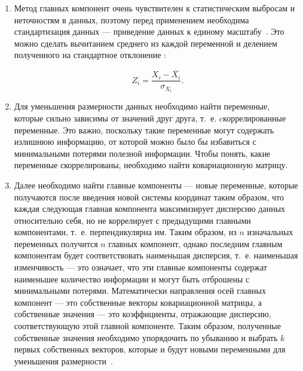 \begin{enumerate}[label=\arabic*.]
	\item Метод главных компонент очень чувствителен к статистическим выбросам и неточностям в данных, поэтому перед применением необходима стандартизация данных --- приведение данных к единому масштабу~\cite{polyak}. Это можно сделать вычитанием среднего из каждой переменной и делением полученного на стандартное отклонение \cite{zakaria}:
	
	\begin{equation}\label{eq:normalization_Z1}
		Z_i = \frac{{X_i - \bar{X_i}}}{{\sigma_{X_i}}}.
	\end{equation}
	\item Для уменьшения размерности данных необходимо найти переменные, которые сильно зависимы от значений друг друга, т.~е. cкоррелированные переменные. Это важно, поскольку такие переменные могут содержать излишнюю информацию, от которой можно было бы избавиться с минимальными потерями полезной информации. Чтобы понять, какие переменные скоррелированы, необходимо найти ковариационную матрицу.
	\item Далее необходимо найти главные компоненты --- новые переменные, которые получаются после введения новой системы координат таким образом, что каждая следующая главная компонента максимизирует дисперсию данных относительно себя, но не коррелирует с предыдущими главными компонентами, т.~е. перпендикулярна им. Таким образом, из $n$ изначальных переменных получится $n$ главных компонент, однако последним главным компонентам будет соответствовать наименьшая дисперсия, т.~е. наименьшая изменчивость --- это означает, что эти главные компоненты содержат наименьшее количество информации и могут быть отброшены с минимальными потерями. Математически направления осей главных компонент --- это собственные векторы ковариационной матрицы, а собственные значения --- это коэффициенты, отражающие дисперсию, соответствующую этой главной компоненте. Таким образом, полученные собственные значения необходимо упорядочить по убыванию и выбрать $k$ первых собственных векторов, которые и будут новыми переменными для уменьшения размерности~\cite{orlov, polyak, zakaria}.
	

\end{enumerate}

